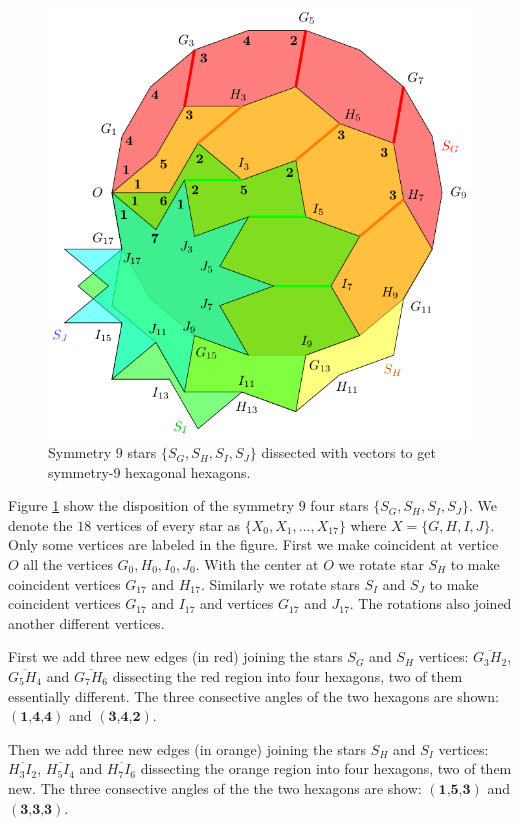 \documentclass[11pt]{article}
\begin{document}
\begin{figure}[h]
\centering
\includegraphics[scale=1]{hexagons-9}
\caption{Symmetry $9$ stars $\{S_G,S_H,S_I,S_J\}$ dissected with vectors to get symmetry-9 hexagonal hexagons.}
\label{fig:hexagons-9}
\end{figure}

Figure \ref{fig:hexagons-9} show the disposition of the symmetry $9$ four stars $\{S_G,S_H,S_I,S_J\}$. We denote the $18$ vertices of every star as $\{X_0,X_1,...,X_{17}\}$ where $X = \{G,H,I,J\}$. Only some vertices are labeled in the figure. First we make coincident at vertice $O$ all the vertices $G_0,H_0,I_0,J_0$. With the center at $O$ we rotate star $S_H$ to make coincident vertices $G_{17}$ and $H_{17}$. Similarly we rotate stars $S_I$ and $S_J$ to make coincident vertices $G_{17}$ and $I_{17}$ and vertices $G_{17}$ and $J_{17}$. The rotations also joined another different vertices.

First we add three new edges (in red) joining the stars $S_G$ and $S_H$ vertices: $\overline{G_3H_2}$, $\overline{G_5H_4}$ and $\overline{G_7H_6}$ dissecting the red region into four hexagons, two of them essentially different. The three consective angles of the two hexagons are shown: $(\textbf{1,4,4})$ and $(\textbf{3,4,2})$.

Then we add three new edges (in orange) joining the stars $S_H$ and $S_I$ vertices: $\overline{H_3I_2}$, $\overline{H_5I_4}$ and $\overline{H_7I_6}$ dissecting the orange region into four hexagons, two of them new. The three consective angles of the the two hexagons are show: $(\textbf{1,5,3})$ and $(\textbf{3,3,3})$.
\end{document}

